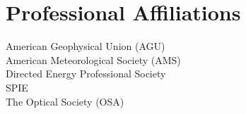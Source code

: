 \section{Professional Affiliations}

\normalsize

American Geophysical Union (AGU)\\
American Meteorological Society (AMS)\\ 
Directed Energy Professional Society\\
SPIE\\ The Optical Society (OSA)
